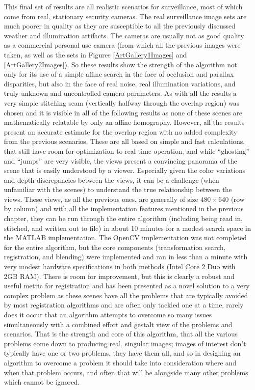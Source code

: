 This final set of results are all realistic scenarios for surveillance, most of which come from real, stationary security cameras. The real surveillance image sets are much poorer in quality as they are susceptible to all the previously discussed weather and illumination artifacts. The cameras are usually not as good quality as a commercial personal use camera (from which all the previous images were taken, as well as the sets in Figures \ref{ArtGallery1Images} and \ref{ArtGallery2Images}). So these results show the strength of the algorithm not only for its use of a simple affine search in the face of occlusion and parallax disparities, but also in the face of real noise, real illumination variations, and truly unknown and uncontrolled camera parameters. As with all the results a very simple stitching seam (vertically halfway through the overlap region) was chosen and it is visible in all of the following results as none of these scenes are mathematically relatable by only an affine homography. However, all the results present an accurate estimate for the overlap region with no added complexity from the previous scenarios. These are all based on simple and fast calculations, that still have room for optimization to real time operation, and while ``ghosting'' and ``jumps'' are very visible, the views present a convincing panorama of the scene that is easily understood by a viewer. Especially given the color variations and depth discrepancies between the views, it can be a challenge (when unfamiliar with the scenes) to understand the true relationship between the views. These views, as all the previous ones, are generally of size $480 \times 640$ (row by column) and with all the implementation features mentioned in the previous chapter, they can be run through the entire algorithm (including being read in, stitched, and written out to file) in about 10 minutes for a modest search space in the MATLAB\textsuperscript{\textregistered} implementation. The OpenCV implementation was not completed for the entire algorithm, but the core components (transformation search, registration, and blending) were implemented and ran in less than a minute with very modest hardware specifications in both methods (Intel\textsuperscript{\textregistered} Core 2 Duo with 2GB RAM). There is room for improvement, but this is clearly a robust and useful metric for registration and has been presented as a novel solution to a very complex problem as these scenes have all the problems that are typically avoided by most registration algorithms and are often only tackled one at a time, rarely does it occur that an algorithm attempts to overcome so many issues simultaneously with a combined effort and gestalt view of the problems and scenarios. That is the strength and core of this algorithm, that all the various problems come down to producing real, singular images; images of interest don't typically have one or two problems, they have them all, and so in designing an algorithm to overcome a problem it should take into consideration where and when that problem occurs, and often that will be alongside many other problems which cannot be ignored.

